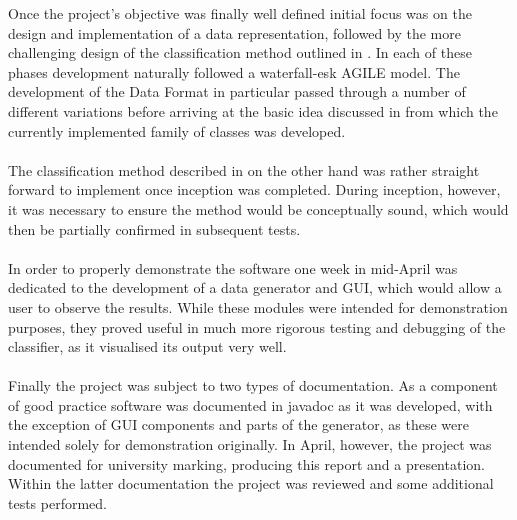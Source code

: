 \documentclass[main.tex]{subfiles}
\begin{document}
      Once the project's objective was finally well defined initial focus was on the design and implementation of a data representation, followed by the more challenging design of the classification method outlined in . In each of these phases development naturally followed a waterfall-esk AGILE model. The development of the Data Format in particular passed through a number of different variations before arriving at the basic idea discussed in  from which the currently implemented family of classes was developed.
      \\\\
      The classification method described in  on the other hand was rather straight forward to implement once inception was completed. During inception, however, it was necessary to ensure the method would be conceptually sound, which would then be partially confirmed in subsequent tests.
      \\\\
      In order to properly demonstrate the software one week in mid-April was dedicated to the development of a data generator and GUI, which would allow a user to observe the results. While these modules were intended for demonstration purposes, they proved useful in much more rigorous testing and debugging of the classifier, as it visualised its output very well.
      \\\\
      Finally the project was subject to two types of documentation. As a component of good practice software was documented in javadoc as it was developed, with the exception of GUI components and parts of the generator, as these were intended solely for demonstration originally. In April, however, the project was documented for university marking, producing this report and a presentation. Within the latter documentation the project was reviewed and some additional tests performed.
    
\end{document}
